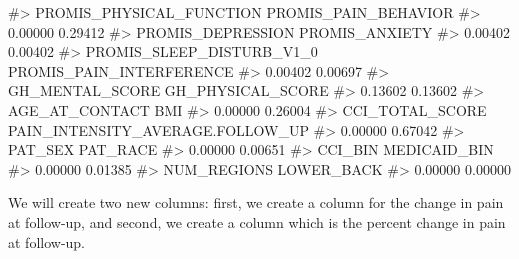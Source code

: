 \documentclass[
  letterpaper,
]{krantz}
\makeatletter
\newenvironment{Shaded}{\begin{snugshade}}{\end{snugshade}}
\newcommand{\CommentTok}[1]{\textcolor[rgb]{0.37,0.37,0.37}{#1}}
\newcommand{\FunctionTok}[1]{\textcolor[rgb]{0.28,0.35,0.67}{#1}}
\newcommand{\NormalTok}[1]{\textcolor[rgb]{0.00,0.23,0.31}{#1}}
\newcommand{\OtherTok}[1]{\textcolor[rgb]{0.00,0.23,0.31}{#1}}
\newcommand{\SpecialCharTok}[1]{\textcolor[rgb]{0.37,0.37,0.37}{#1}}
\newenvironment{kframe}{%
\medskip{}
\setlength{\fboxsep}{.8em}
 \def\at@end@of@kframe{}%
 \ifinner\ifhmode%
  \def\at@end@of@kframe{\end{minipage}}%
  \begin{minipage}{\columnwidth}%
 \fi\fi%
 \def\FrameCommand##1{\hskip\@totalleftmargin \hskip-\fboxsep
 \colorbox{shadecolor}{##1}\hskip-\fboxsep
     \hskip-\linewidth \hskip-\@totalleftmargin \hskip\columnwidth}%
 \MakeFramed {\advance\hsize-\width
   \@totalleftmargin\z@ \linewidth\hsize
   \@setminipage}}%
 {\par\unskip\endMakeFramed%
 \at@end@of@kframe}
\renewenvironment{Shaded}{\begin{kframe}}{\end{kframe}}
\makeatother
\begin{document}
\begin{Shaded}
\begin{Highlighting}[]
\CommentTok{\#\textgreater{}         PROMIS\_PHYSICAL\_FUNCTION             PROMIS\_PAIN\_BEHAVIOR }
\CommentTok{\#\textgreater{}                          0.00000                          0.29412 }
\CommentTok{\#\textgreater{}                PROMIS\_DEPRESSION                   PROMIS\_ANXIETY }
\CommentTok{\#\textgreater{}                          0.00402                          0.00402 }
\CommentTok{\#\textgreater{}        PROMIS\_SLEEP\_DISTURB\_V1\_0         PROMIS\_PAIN\_INTERFERENCE }
\CommentTok{\#\textgreater{}                          0.00402                          0.00697 }
\CommentTok{\#\textgreater{}                  GH\_MENTAL\_SCORE                GH\_PHYSICAL\_SCORE }
\CommentTok{\#\textgreater{}                          0.13602                          0.13602 }
\CommentTok{\#\textgreater{}                   AGE\_AT\_CONTACT                              BMI }
\CommentTok{\#\textgreater{}                          0.00000                          0.26004 }
\CommentTok{\#\textgreater{}                  CCI\_TOTAL\_SCORE PAIN\_INTENSITY\_AVERAGE.FOLLOW\_UP }
\CommentTok{\#\textgreater{}                          0.00000                          0.67042 }
\CommentTok{\#\textgreater{}                          PAT\_SEX                         PAT\_RACE }
\CommentTok{\#\textgreater{}                          0.00000                          0.00651 }
\CommentTok{\#\textgreater{}                          CCI\_BIN                     MEDICAID\_BIN }
\CommentTok{\#\textgreater{}                          0.00000                          0.01385 }
\CommentTok{\#\textgreater{}                      NUM\_REGIONS                       LOWER\_BACK }
\CommentTok{\#\textgreater{}                          0.00000                          0.00000}
\end{Highlighting}
\end{Shaded}

We will create two new columns: first, we create a column for the change
in pain at follow-up, and second, we create a column which is the
percent change in pain at follow-up.

\begin{Shaded}
\end{Shaded}
\end{document}
